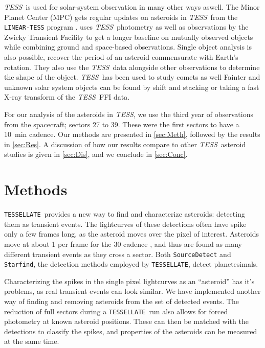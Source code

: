 \documentclass[12pt]{article}
\newcommand{\ttt}{\texttt}
\newcommand{\tess}{\textit{TESS}}
\newcommand{\tessellate}{\texttt{TESSELLATE}}
\begin{document}
\tess\ is used for solar-system observation in many other ways aswell.
The Minor Planet Center (MPC) gets regular updates on asteroids in \tess\ from the \ttt{LINEAR-TESS} program \citep{Woods2021}.
\citet{Gowanlock2024} uses \tess\ photometry as well as observations by the Zwicky Transient Facility \citep[ZTF, ][]{Bellm2019} to get a longer baseline on mutually observed objects while combining ground and space-based observations.
Single object analysis is also possible, \citet{Humes2024} recover the period of an asteroid commensurate with Earth's rotation.
They also use the \tess\ data alongside other observations to determine the shape of the object.
\tess\ has been used to study comets as well \citep[e.g.][]{Ridden-Harper2021b}
Fainter and unknown solar system objects can be found by shift and stacking \citep{Holman2019, Payne2019, Rice2020} or taking a fast X-ray transform \citep{Nguyen2024} of the \tess\ FFI data.

For our analysis of the asteroids in \tess, we use the third year of observations from the spacecraft; sectors 27 to 39. 
These were the first sectors to have a \qty{10}{\minute} cadence.
Our methods are presented in \autoref{sec:Meth}, followed by the results in \autoref{sec:Res}.
A discussion of how our results compare to other \tess\ asteroid studies is given in \autoref{sec:Dis}, and we conclude in \autoref{sec:Conc}.

\section{Methods}\label{sec:Meth}


\tessellate\ provides a new way to find and characterize asteroids: detecting them as transient events.
The lightcurves of these detections often have spike only a few frames long, as the asteroid moves over the pixel of interest.
Asteroids move at about \qty{1}{\px} per frame for the \qty{30}{\min} cadence \citep{Pal2018}, and thus are found as many different transient events as they cross a sector.
Both \ttt{SourceDetect} and \ttt{Starfind}, the detection methods employed by \tessellate, detect planetesimals.

Characterizing the spikes in the single pixel lightcurves as an ``asteroid'' has it's problems, as real transient events can look similar.
We have implemented another way of finding and removing asteroids from the set of detected events.
The reduction of full sectors during a \tessellate\ run also allows for forced photometry at known asteroid positions.
These can then be matched with the detections to classify the spikes, and properties of the asteroids can be measured at the same time.
\end{document}
